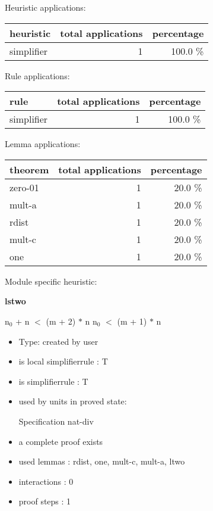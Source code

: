 \documentclass[a4paper]{article}
\begin{document}
\medskip


Heuristic applications:

\begin{supertabular}{l|r|r}
heuristic	& total applications & percentage \\ \hline
simplifier & 1 & 100.0 \% \\

\end{supertabular}

Rule applications:

\begin{supertabular}{l|r|r}
rule	        & total applications & percentage \\ \hline
simplifier & 1 & 100.0 \% \\

\end{supertabular}

Lemma applications:

\begin{supertabular}{l|r|r}
theorem	        & total applications & percentage \\ \hline
zero-01 & 1 & 20.0 \% \\
mult-a & 1 & 20.0 \% \\
rdist & 1 & 20.0 \% \\
mult-c & 1 & 20.0 \% \\
one & 1 & 20.0 \% \\

\end{supertabular}

Module specific heuristic:

\pagebreak

{\LARGE\bf lstwo}\label{lemma-lstwo}

\medskip

 \Fol $\mbox{n}_{0}$ + n $<$ (m + 2) $*$ n \Equiv $\mbox{n}_{0}$ $<$ (m + 1) $*$ n

\begin{itemize}

\item Type: created by user

\item is local simplifierrule : T
\item is simplifierrule : T
\item used by units in proved state:

Specification nat-div
\item       a complete proof exists
\item       used lemmas  : rdist, one, mult-c, mult-a, ltwo
\item       interactions : 0
\item       proof steps  : 1
\end{itemize}
\end{document}
